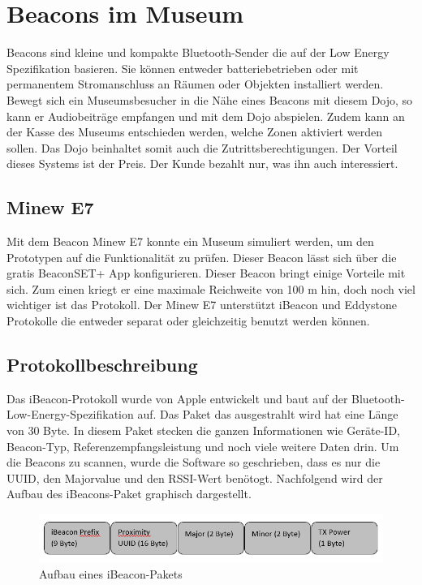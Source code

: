 \section{Beacons im Museum}
Beacons sind kleine und kompakte Bluetooth-Sender die auf der Low Energy Spezifikation basieren. Sie können entweder batteriebetrieben oder mit permanentem Stromanschluss an Räumen oder Objekten installiert werden. Bewegt sich ein Museumsbesucher in die Nähe eines Beacons mit diesem Dojo, so kann er Audiobeiträge empfangen und mit dem Dojo abspielen. Zudem kann an der Kasse des Museums entschieden werden, welche Zonen aktiviert werden sollen. Das Dojo beinhaltet somit auch die Zutrittsberechtigungen. Der Vorteil dieses Systems ist der Preis. Der Kunde bezahlt nur, was ihn auch interessiert.

\subsection*{Minew E7}
Mit dem Beacon Minew E7 konnte ein Museum simuliert werden, um den Prototypen auf die Funktionalität zu prüfen. Dieser Beacon lässt sich über die gratis BeaconSET+ App konfigurieren. Dieser Beacon bringt einige Vorteile mit sich. Zum einen kriegt er eine maximale Reichweite von 100 m  hin, doch noch viel wichtiger ist das Protokoll. Der Minew E7 unterstützt iBeacon und Eddystone Protokolle die entweder separat oder gleichzeitig benutzt werden können. 

\subsection*{Protokollbeschreibung}
Das iBeacon-Protokoll wurde von Apple entwickelt und baut auf der Bluetooth-Low-Energy-Spezifikation auf. Das Paket das ausgestrahlt wird hat eine Länge von 30 Byte. In diesem Paket stecken die ganzen Informationen wie Geräte-ID, Beacon-Typ, Referenzempfangsleistung und noch viele weitere Daten drin. Um die Beacons zu scannen, wurde die Software so geschrieben, dass es nur die UUID, den Majorvalue und den RSSI-Wert benötogt. Nachfolgend wird der Aufbau des iBeacons-Paket graphisch dargestellt. 


\begin{figure}[htp]
	\centering
	\includegraphics[width=15cm]{Bilder/iBeacon_Paket.PNG}
	 \caption{Aufbau eines iBeacon-Pakets}
	 \label{fig:iBeacon}
\end{figure}

